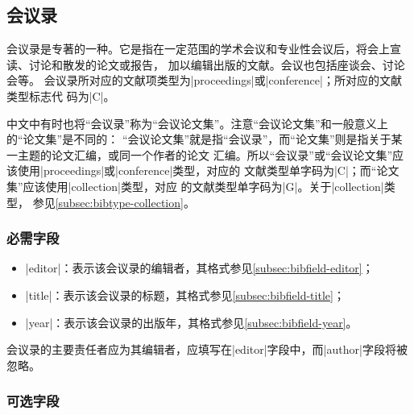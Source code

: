 \subsection{会议录}\label{subsec:bibtype-conference}

会议录是专著的一种。它是指在一定范围的学术会议和专业性会议后，将会上宣读、讨论和散发的论文或报告，
加以编辑出版的文献\cite{hudong2013huiyilu}。会议也包括座谈会、讨论会等\cite{gbt7714-2005}。
会议录所对应的{\BibTeX}文献项类型为|proceedings|或|conference|；所对应的文献类型标志代
码为|C|\cite{gbt7714-2005}。

\begin{note}
中文中有时也将“会议录”称为“会议论文集”。注意“会议论文集”和一般意义上的“论文集”是不同的：
“会议论文集”就是指“会议录”，而“论文集”则是指关于某一主题的论文汇编，或同一个作者的论文
汇编。所以“会议录”或“会议论文集”应该使用|proceedings|或|conference|类型，对应的
文献类型单字码为|C|；而“论文集”应该使用|collection|类型，对应
的文献类型单字码为|G|。关于|collection|类型，
参见\ref{subsec:bibtype-collection}。
\end{note}

\subsubsection{必需字段}

\begin{itemize}
\item |editor|：表示该会议录的编辑者，其格式参见\ref{subsec:bibfield-editor}；
\item |title|：表示该会议录的标题，其格式参见\ref{subsec:bibfield-title}；
\item |year|：表示该会议录的出版年，其格式参见\ref{subsec:bibfield-year}。
\end{itemize}

\begin{note}
会议录的主要责任者应为其编辑者，应填写在|editor|字段中，而|author|字段将被忽略。
\end{note}

\subsubsection{可选字段}

